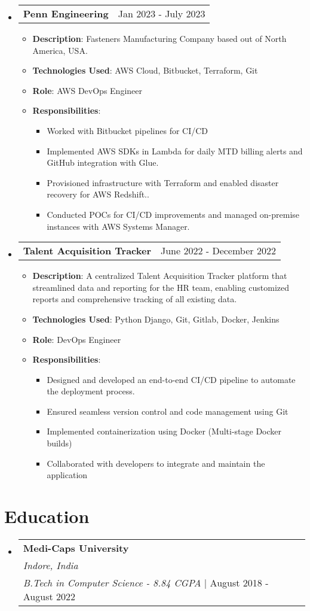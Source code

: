 \documentclass[a4paper,10pt]{article}
\makeatletter
\newcommand{\resumeItem}[1]{
  \item\small{
    {#1 \vspace{-2pt}}
  }
}
\newcommand{\resumeSubheading}[4]{
  \item
  \begin{tabular*}{\textwidth}{l}
    \textbf{#1} \\  %
    \textit{#2} \\  %
    \textit{#3} | #4 \\  %
  \end{tabular*}\vspace{-5pt}
}
\newcommand{\resumeProjectHeading}[2]{
  \item
  \begin{tabular*}{\textwidth}[t]{l@{\extracolsep{\fill}}r}
    \small\textbf{#1} & #2 \\
  \end{tabular*}
}
\newcommand{\resumeSubHeadingListStart}{\begin{itemize}[leftmargin=0.15in, label={}]}
\newcommand{\resumeSubHeadingListEnd}{\end{itemize}}
\newcommand{\resumeItemListStart}{\begin{itemize}}
\newcommand{\resumeItemListEnd}{\end{itemize}}
\makeatother
\begin{document}
\vspace{2cm}

\resumeSubHeadingListStart
  \resumeProjectHeading
    {Penn Engineering }{Jan 2023 - July 2023}
    \resumeItemListStart
      \resumeItem{\textbf{Description}:  Fasteners Manufacturing Company based out of North America, USA.}
      \resumeItem{\textbf{Technologies Used}: AWS Cloud, Bitbucket, Terraform, Git}
      \resumeItem{\textbf{Role}: AWS DevOps Engineer}
      \resumeItem{\textbf{Responsibilities}:}
      \resumeItemListStart
        \resumeItem{Worked with Bitbucket pipelines for CI/CD}
        \resumeItem{Implemented AWS SDKs in Lambda for daily MTD billing alerts and GitHub integration with Glue.}
        \resumeItem{Provisioned infrastructure with Terraform and enabled disaster recovery for AWS Redshift..}
        \resumeItem{Conducted POCs for CI/CD improvements and managed on-premise instances with AWS Systems Manager.}
      \resumeItemListEnd
    \resumeItemListEnd
\resumeSubHeadingListEnd


\resumeSubHeadingListStart
  \resumeProjectHeading
    {Talent Acquisition Tracker }{June 2022 - December 2022}
    \resumeItemListStart
      \resumeItem{\textbf{Description}: A centralized Talent Acquisition Tracker platform that streamlined data and reporting for the HR team, enabling customized reports and comprehensive tracking of all existing data.}
      \resumeItem{\textbf{Technologies Used}: Python Django, Git, Gitlab, Docker, Jenkins}
      \resumeItem{\textbf{Role}: DevOps Engineer}
      \resumeItem{\textbf{Responsibilities}:}
      \resumeItemListStart
        \resumeItem{Designed and developed an end-to-end CI/CD pipeline to automate the deployment process.}
        \resumeItem{Ensured seamless version control and code management using Git}
        \resumeItem{Implemented containerization using Docker (Multi-stage Docker builds)}
        \resumeItem{Collaborated with developers to integrate and maintain the application}

      \resumeItemListEnd
    \resumeItemListEnd
\resumeSubHeadingListEnd


\section{Education}
\resumeSubHeadingListStart
  \resumeSubheading
    {Medi-Caps University}{Indore, India}
    {B.Tech in Computer Science - 8.84 CGPA}{August 2018 - August 2022}
\resumeSubHeadingListEnd
\end{document}
